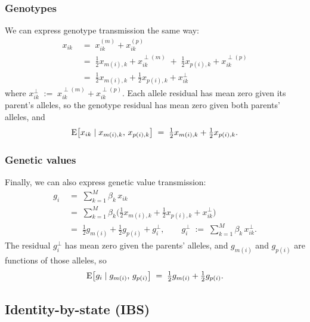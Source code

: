\documentclass[12pt]{article}
\numberwithin{equation}{section}
\begin{document}
\subsubsection{Genotypes}
We can express genotype transmission the same way:
\begin{equation}\label{eq:genotype-transmit}
\begin{aligned}
    x_{ik} \;&=\; x^{(m)}_{ik} + x^{(p)}_{ik} \\
    \;&=\; \tfrac12 x_{m(i),k} + x^{\perp(m)}_{ik} \;+\; \tfrac12 x_{p(i),k} + x^{\perp(p)}_{ik} \\
    \;&=\; \tfrac12 x_{m(i),k} + \tfrac12 x_{p(i),k} + x^{\perp}_{ik}
\end{aligned}
\end{equation}
where $x^{\perp}_{ik} \;:=\; x^{\perp(m)}_{ik} + x^{\perp(p)}_{ik}$.
Each allele residual has mean zero given its parent's alleles, so the genotype residual has mean zero given both parents' alleles, and
$$ \mathrm{E}\big[x_{ik} \mid x_{m(i),k},\, x_{p(i),k}\big] \;=\; \tfrac12 x_{m(i),k} + \tfrac12 x_{p(i),k} . $$

\subsubsection{Genetic values}
Finally, we can also express genetic value transmission:
\begin{equation}\label{eq:g-transmit}
\begin{aligned}
    g_i \;&=\; \sum_{k=1}^{M} \beta_k\, x_{ik} \\
    \;&=\; \sum_{k=1}^{M} \beta_k \Big(\tfrac12 x_{m(i),k} + \tfrac12 x_{p(i),k} + x^{\perp}_{ik}\Big) \\
    \;&=\; \tfrac12 g_{m(i)} + \tfrac12 g_{p(i)} + g^{\perp}_i ,
    \qquad g^{\perp}_i \;:=\; \sum_{k=1}^{M} \beta_k\, x^{\perp}_{ik} .
\end{aligned}
\end{equation}
The residual $g^{\perp}_i$ has mean zero given the parents' alleles, and $g_{m(i)}$ and $g_{p(i)}$ are functions of those alleles, so
$$ \mathrm{E}\big[g_i \mid g_{m(i)},\, g_{p(i)}\big] \;=\; \tfrac12 g_{m(i)} + \tfrac12 g_{p(i)} . $$

\subsection{Identity-by-state (IBS)}\label{sec:ibs}
\end{document}
